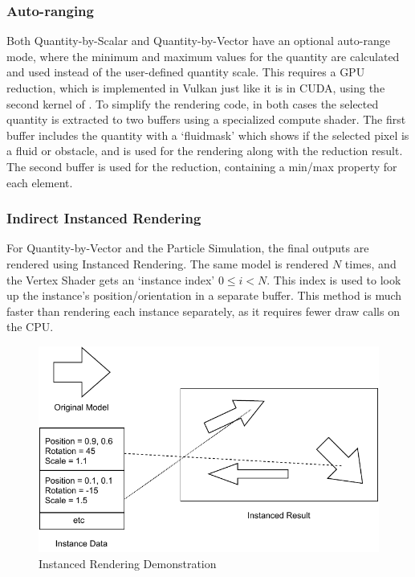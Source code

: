 \subsubsection{Auto-ranging}
Both Quantity-by-Scalar and Quantity-by-Vector have an optional auto-range mode, where the minimum and maximum values for the quantity are calculated and used instead of the user-defined quantity scale.
This requires a GPU reduction, which is implemented in Vulkan just like it is in CUDA, using the second kernel of \cite{CUDAParallelReduction}.
To simplify the rendering code, in both cases the selected quantity is extracted to two buffers using a specialized compute shader.
The first buffer includes the quantity with a `fluidmask' which shows if the selected pixel is a fluid or obstacle, and is used for the rendering along with the reduction result.
The second buffer is used for the reduction, containing a min/max property for each element.%

\subsubsection{Indirect Instanced Rendering}
For Quantity-by-Vector and the Particle Simulation, the final outputs are rendered using Instanced Rendering.%
The same model is rendered $N$ times, and the Vertex Shader gets an `instance index' $0 \le i < N$.
This index is used to look up the instance's position/orientation in a separate buffer.
This method is much faster than rendering each instance separately, as it requires fewer draw calls on the CPU.
\begin{figure}
    \centering
    \includegraphics{Ch42Design/figures/FinalReport_InstancedRendering.pdf}
    \caption{Instanced Rendering Demonstration}
    \label{fig:InstancedRendering}
\end{figure}

